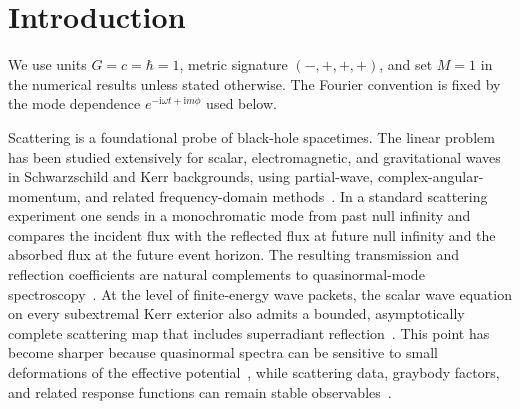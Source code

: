 \documentclass[aps,prd,twocolumn,10pt,nofootinbib,superscriptaddress,floatfix]{revtex4-2}
\newcommand{\ii}{\mathrm{i}}
\begin{document}
\begin{abstract}
Matched near-NHEK theory yields the factorization
$M^{2n-2}\chi_H^{(n)}={\cal I}_H^n{\cal K}_{n,h}$, separating the analytically
known linear intensity from an unevaluated nonlinear Green kernel.  It explains
why no conformal-weight-only law follows for supplementary modes and why the
principal weak-coupling limit is nonuniform: successive local operators gain
an additional $|{\cal A}_{\rm in}|^2/(M\kappa)$ in their relative control
parameter and can reverse their moderate-spin ordering.  Spectral tails,
off-grid residuals, paired resolutions, Wronskians, and flux balance provide
independent checks.  The result is a prescribed scalar response on fixed Kerr,
not a metric perturbation or gravitational self-force observable.
\end{abstract}


\maketitle

\section{Introduction}

We use units $G=c=\hbar=1$, metric signature $(-,+,+,+)$, and set
$M=1$ in the numerical results unless stated otherwise.  The Fourier
convention is fixed by the mode dependence $e^{-\ii\omega t+\ii m\phi}$
used below.

Scattering is a foundational probe of black-hole spacetimes.  The linear
problem has been studied extensively for scalar, electromagnetic, and
gravitational waves in Schwarzschild and Kerr backgrounds, using partial-wave,
complex-angular-momentum, and related frequency-domain
methods~\cite{Sanchez1976,Futterman,GlampedakisAndersson2001,
Dolan2008,Decanini2003,Decanini2011}.  In a standard scattering experiment one
sends in a monochromatic mode from past null infinity and compares the incident
flux with the reflected flux at future null infinity and the absorbed flux at
the future event horizon.  The resulting transmission and reflection
coefficients are natural complements to quasinormal-mode
spectroscopy~\cite{Berti2009}.  At the level of finite-energy wave packets, the
scalar wave equation on every subextremal Kerr exterior also admits a bounded,
asymptotically complete scattering map that includes superradiant
reflection~\cite{Dafermos2018}.  This point has become sharper because
quasinormal spectra can be sensitive to small deformations of the effective
potential~\cite{Nollert1996,Jaramillo2021,Cheung2022}, while scattering data,
graybody factors, and related response functions can remain stable
observables~\cite{Kyutoku2023,Torres2023,Rosato2024,Oshita2023,Oshita2024}.
\end{document}
